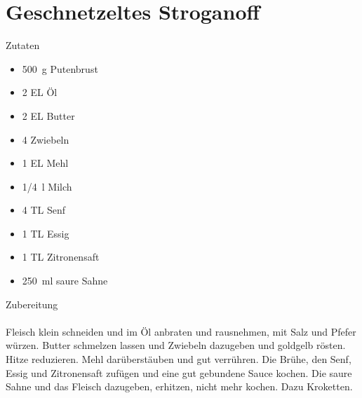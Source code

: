 \section*{Geschnetzeltes Stroganoff}
\ihead{}\ohead{}
\cfoot{}
{\Large Zutaten}
\begin{multicols}{2}
\begin{itemize}
    \item \SI{500}{g} Putenbrust
    \item \num{2} EL Öl
    \item \num{2} EL Butter
    \item \num{4} Zwiebeln
    \item \num{1} EL Mehl
    \item \SI{1/4}{l} Milch
    \item \num{4} TL Senf
    \item \num{1} TL Essig
    \item \num{1} TL Zitronensaft
    \item \SI{250}{ml} saure Sahne 
\end{itemize}
\end{multicols}
\noindent
{\Large Zubereitung}\\
\\
Fleisch klein schneiden und im Öl anbraten und rausnehmen, mit Salz und Pfefer würzen.
Butter schmelzen lassen und Zwiebeln dazugeben und goldgelb rösten.
Hitze reduzieren.
Mehl darüberstäuben und gut verrühren.
Die Brühe, den Senf, Essig und Zitronensaft zufügen und eine gut gebundene Sauce kochen.
Die saure Sahne und das Fleisch dazugeben, erhitzen, nicht mehr kochen.
Dazu Kroketten.
